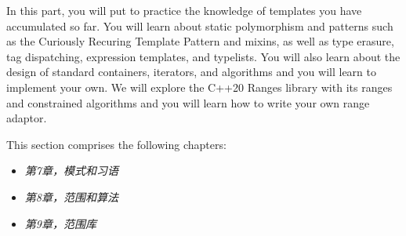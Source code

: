 In this part, you will put to practice the knowledge of templates you have accumulated so far. You will learn about static polymorphism and patterns such as the Curiously Recuring Template Pattern and mixins, as well as type erasure, tag dispatching, expression templates, and typelists. You will also learn about the design of standard containers, iterators, and algorithms and you will learn to implement your own. We will explore the C++20 Ranges library with its ranges and constrained algorithms and you will learn how to write your own range adaptor.

This section comprises the following chapters:

\begin{itemize}
\item
\textit{第7章，模式和习语}

\item
\textit{第8章，范围和算法}

\item
\textit{第9章，范围库}
\end{itemize}